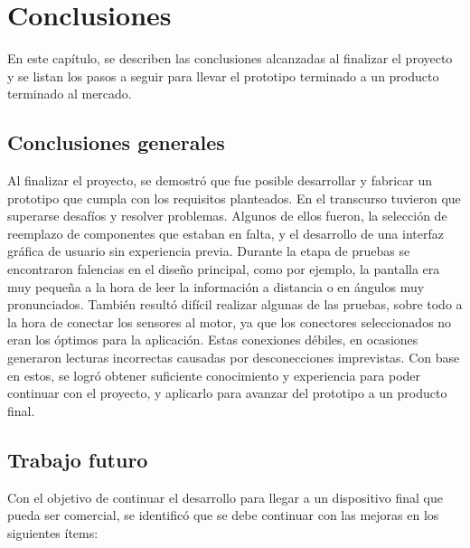 \chapter{Conclusiones}

\label{Chapter5}

En este capítulo, se describen las conclusiones alcanzadas al finalizar el proyecto y se listan los pasos a seguir para llevar el prototipo terminado a un producto terminado al mercado.

\section{Conclusiones generales}

Al finalizar el proyecto, se demostró que fue posible desarrollar y fabricar un prototipo que cumpla con los requisitos planteados. En el transcurso tuvieron que superarse desafíos y resolver problemas. Algunos de ellos fueron, la selección de reemplazo de componentes que estaban en falta, y el desarrollo de una interfaz gráfica de usuario sin experiencia previa.  Durante la etapa de pruebas se encontraron falencias en el diseño principal, como por ejemplo, la pantalla era muy pequeña a la hora de leer la información a distancia o en ángulos muy pronunciados. También resultó difícil realizar algunas de las pruebas, sobre todo a la hora de conectar los sensores al motor, ya que los conectores seleccionados no eran los óptimos para la aplicación. Estas conexiones débiles, en ocasiones generaron lecturas incorrectas causadas por desconecciones imprevistas. Con base en estos, se logró obtener suficiente conocimiento y experiencia para poder continuar con el proyecto, y aplicarlo para avanzar del prototipo a un producto final.

\section{Trabajo futuro}
Con el objetivo de continuar el desarrollo para llegar a un dispositivo final que pueda ser comercial, se identificó que se debe continuar con las mejoras en los siguientes ítems:

